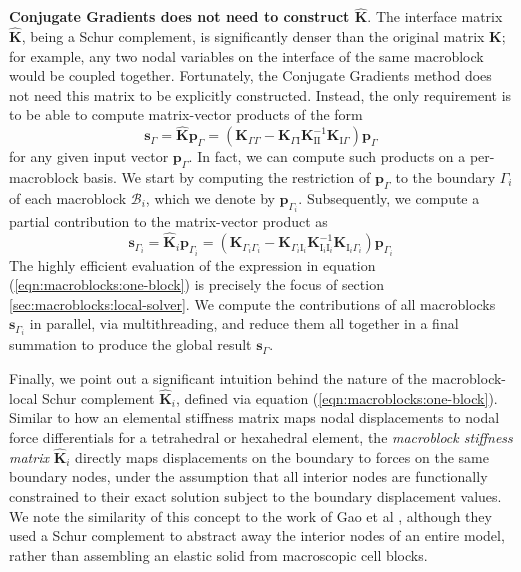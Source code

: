 \noindent\textbf{Conjugate Gradients does not need to construct $\hat{\mathbf{K}}$}. The interface matrix $\hat{\mathbf{K}}$, being a Schur complement, is significantly denser than
the original matrix $\mathbf{K}$; for example, any two nodal variables
on the interface of the same macroblock would be coupled
together. Fortunately, the Conjugate Gradients method does not need
this matrix to be explicitly constructed. Instead, the only
requirement is to be able to compute matrix-vector products of the
form
$$
\mathbf{s}_\Gamma=\hat{\mathbf{K}}\mathbf{p}_\Gamma=\left(\mathbf{K}_{\Gamma\Gamma}- \mathbf{K}_{\Gamma\mathrm{I}}\mathbf{K}_{\mathrm{I}\mathrm{I}}^{-1}\mathbf{K}_{\mathrm{I}\Gamma}\right)\mathbf{p}_\Gamma
$$
for any given input vector $\mathbf{p}_\Gamma$. In fact, we can compute such products on a per-macroblock basis. We start by computing the restriction of
$\mathbf{p}_\Gamma$ to the boundary $\Gamma_i$ of each macroblock $\mathcal{B}_i$, which we denote by $\mathbf{p}_{\Gamma_i}$. Subsequently, we compute a partial contribution to
the matrix-vector product as
\begin{equation}
\mathbf{s}_{\Gamma_i}=\hat{\mathbf{K}}_i\mathbf{p}_{\Gamma_i}=\left(\mathbf{K}_{\Gamma_i\Gamma_i}-
  \mathbf{K}_{\Gamma_i\mathrm{I}_i}\mathbf{K}_{\mathrm{I}_i\mathrm{I}_i}^{-1}\mathbf{K}_{\mathrm{I}_i\Gamma_i}\right)\mathbf{p}_{\Gamma_i}
\label{eqn:macroblocks:one-block}
\end{equation}
The highly efficient evaluation of the expression in equation
(\ref{eqn:macroblocks:one-block}) is precisely the focus of section
\ref{sec:macroblocks:local-solver}. We compute the contributions of all
macroblocks $\mathbf{s}_{\Gamma_i}$ in parallel, via multithreading,
and reduce them all together in a final summation to produce the
global result $\mathbf{s}_\Gamma$.

Finally, we point out a significant intuition behind the nature of the
macroblock-local Schur complement $\hat{\mathbf{K}}_i$, defined via
equation (\ref{eqn:macroblocks:one-block}). Similar to how an elemental stiffness
matrix maps nodal displacements to nodal force differentials for a
tetrahedral or hexahedral element, the \emph{macroblock stiffness
  matrix} $\hat{\mathbf{K}}_i$ directly maps displacements on the
boundary to forces on the same boundary nodes, under the assumption
that all interior nodes are functionally constrained to their exact
solution subject to the boundary displacement values. We note the
similarity of this concept to the work of Gao et al \cite{GaoMS:2014},
although they used a Schur complement to abstract away the interior
nodes of an entire model, rather than assembling an elastic solid from
macroscopic cell blocks.


